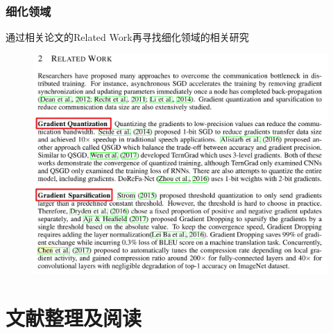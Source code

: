 \documentclass[hyperref={pdfpagelabels=false}]{beamer}
\begin{document}
\begin{frame}
	\frametitle{细化领域}
	通过相关论文的Related Work再寻找细化领域的相关研究
	\begin{figure}
		\centering
		\includegraphics[height=0.8\textheight]{./figure/5.png}
	\end{figure}
\end{frame}

\section{文献整理及阅读}
\begin{frame}
	\tableofcontents[currentsection]
\end{frame} 
\end{document}
